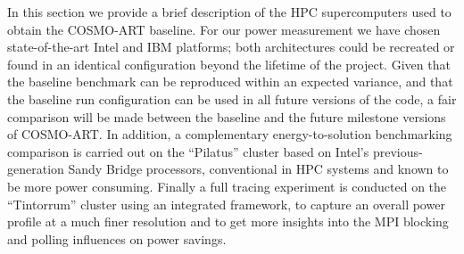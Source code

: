 In this section we provide a brief description of the HPC supercomputers
used to obtain the COSMO-ART baseline. For our power measurement we have chosen state-of-the-art Intel and IBM platforms;
both architectures could be recreated or found in an identical configuration
beyond the lifetime of the project.  Given that the baseline benchmark
can be reproduced  within an expected variance, and  that the baseline
run configuration  can be used in  all future versions of  the code, a
fair comparison  will be made  between the baseline and  the future milestone
versions   of    COSMO-ART. In addition, a   complementary energy-to-solution  benchmarking  comparison  is  carried out  on  the
``Pilatus'' cluster based  on Intel's previous-generation Sandy Bridge
processors, conventional  in HPC  systems and known  to be  more power
consuming.   Finally a  full tracing  experiment is  conducted  on the
``Tintorrum''  cluster using  an integrated  framework, to  capture an
overall  power profile  at a  much finer  resolution and  to  get more
insights  into  the  MPI  blocking  and polling  influences  on  power
savings.






